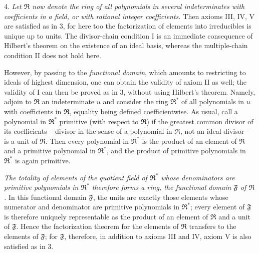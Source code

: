 \documentclass[11pt]{article}
\providecommand{\mR}{\mathfrak{R}}
\providecommand{\mF}{\mathfrak{F}}
\begin{document}
4. \emph{Let $\mR$ now denote the ring of all polynomials in several indeterminates with coefficients in a field, or with rational integer coefficients.} Then axioms III, IV, V are satisfied as in 3, for here too the factorization of elements into irreducibles is unique up to units. The divisor-chain condition I is an immediate consequence of Hilbert's theorem on the existence of an ideal basis, whereas the multiple-chain condition II does not hold here.

However, by passing to the \emph{functional domain}, which amounts to restricting to ideals of highest dimension, one can obtain the validity of axiom II as well; the validity of I can then be proved as in 3, without using Hilbert's theorem. Namely, adjoin to $\mR$ an indeterminate $u$ and consider the ring $\mR^*$ of all polynomials in $u$ with coefficients in $\mR$, equality being defined coefficientwise. As usual, call a polynomial in $\mR^*$ primitive (with respect to $\mR$) if the greatest common divisor of its coefficients -- divisor in the sense of a polynomial in $\mR$, not an ideal divisor -- is a unit of $\mR$. Then every polynomial in $\mR^*$ is the product of an element of $\mR$ and a primitive polynomial in $\mR^*$, and the product of primitive polynomials in $\mR^*$ is again primitive.

\emph{The totality of elements of the quotient field of $\mR^*$ whose denominators are primitive polynomials in $\mR^*$ therefore forms a ring, the functional domain $\mF$ of $\mR$.} In this functional domain $\mF$, the units are exactly those elements whose numerator and denominator are primitive polynomials in $\mR^*$; every element of $\mF$ is therefore uniquely representable as the product of an element of $\mR$ and a unit of $\mF$. Hence the factorization theorem for the elements of $\mR$ transfers to the elements of $\mF$; for $\mF$, therefore, in addition to axioms III and IV, axiom V is also satisfied as in 3.
\end{document}
